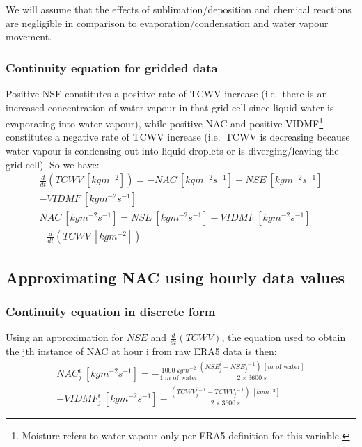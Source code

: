 We will assume that the effects of sublimation/deposition and chemical reactions are negligible in comparison to evaporation/condensation and water vapour movement.

\subsubsection{Continuity equation for gridded data}

Positive \ac{NSE} constitutes a positive rate of \ac{TCWV} increase (i.e.\ there is an increased concentration of water vapour in that grid cell since liquid water is evaporating into water vapour), while positive \ac{NAC} and positive \ac{VIDMF}\footnote{Moisture refers to water vapour only per ERA5 definition for this variable.} constitutes a negative rate of \ac{TCWV} increase (i.e.\ \ac{TCWV} is decreasing because water vapour is condensing out into liquid droplets or is diverging/leaving the grid cell). So we have:
\begin{eqnarray}
	\frac{d}{dt}(TCWV \ [kg m^{-2}]) = -NAC \ [kg m^{-2} s^{-1}] + NSE \ [kg m^{-2} s^{-1}] \\
	- VIDMF \ [kg m^{-2} s^{-1}] \nonumber \\
	\label{eq:nac_app}
	NAC \ [kg m^{-2} s^{-1}] = NSE \ [kg m^{-2} s^{-1}] - VIDMF \ [kg m^{-2} s^{-1}] \\ 
	- \frac{d}{dt}(TCWV \ [kg m^{-2}]) \nonumber
\end{eqnarray}

\subsection{Approximating NAC using hourly data values}

\subsubsection{Continuity equation in discrete form}

Using an approximation for $NSE$ and $\frac{d}{dt} (TCWV)$, the equation used to obtain the jth instance of \ac{NAC} at hour i from raw \ac{ERA5} data is then:
\begin{eqnarray}
	\label{eq:nac^i_j}
	NAC^i_j \ [kg m^{-2} s^{-1}] = - \frac{1000 \ kg m^{-2}}{1 \ m \mbox{ of water}} \frac{(NSE^i_j + NSE^{i-1}_j) \ [m \mbox{ of water}]}{2 \times 3600 \ s} \\
	- VIDMF^i_j \ [kg m^{-2} s^{-1}] - \frac{(TCWV^{i+1}_j - TCWV^{i-1}_j) \ [kg m^{-2}]}{2 \times 3600 \ s} \nonumber
\end{eqnarray}

